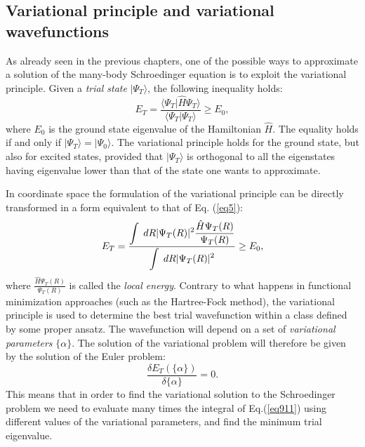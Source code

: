 \subsection{Variational principle and variational wavefunctions}
As already seen in the previous chapters, one of the possible ways to approximate
a solution of the many-body Schroedinger equation is to exploit the variational principle.
Given a {\it trial state} $|\Psi_T\rangle$, the following inequality holds:
\begin{equation}
E_T=\frac{\langle \Psi_T\vert \hat{H}\Psi_T\rangle}{\langle\Psi_T\vert\Psi_T\rangle}\geq E_0,
\end{equation}
where $E_0$ is the ground state eigenvalue of the Hamiltonian $\hat{H}$. The equality holds
if and only if $\vert \Psi_T\rangle = \vert \Psi_0\rangle$. The variational principle holds for the ground state, but also for excited states, provided that $\vert \Psi_T\rangle$ is 
orthogonal to all the eigenstates having eigenvalue lower than that of the state one wants
to approximate.

In coordinate space the formulation of the variational principle can be directly
transformed in a form equivalent to that of Eq. (\ref{eq5}):
\begin{equation}
E_T=  \displaystyle\frac{\displaystyle\int\; dR \vert \Psi_T(R)\vert^2\displaystyle\displaystyle\frac{\hat{H}\Psi_T(R)}{ \Psi_T(R)}}{\displaystyle\int\; dR \vert \Psi_T(R) \vert^2}\geq E_0, \label{eq911}
\end{equation}
where $\frac{\hat{H}\Psi_T(R)}{ \Psi_T(R)}$ is called the {\it local energy}. 
Contrary to what happens in functional 
minimization approaches (such as the Hartree-Fock method), the variational 
principle is used to determine the best trial wavefunction within a class defined
by some proper ansatz. The wavefunction will depend on a set of 
{\it variational parameters} $\{\alpha\}$. The solution of the variational problem
will therefore be given by the solution of the Euler problem:
\begin{equation}
\frac{\delta E_T(\{\alpha \})}{\delta \{\alpha\}}=0.
\end{equation} 
This means that in order to find the variational solution to the Schroedinger problem we need to evaluate many times the integral of Eq.(\ref{eq911}) using
different values of the variational parameters, and find the minimum trial eigenvalue. 
